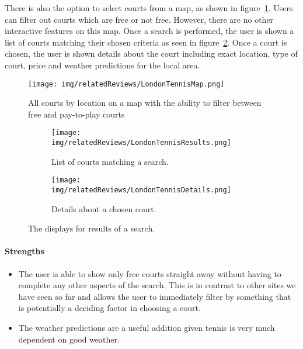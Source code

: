 There is also the option to select courts from a map, as shown in
figure~\ref{fig:LondonTennisMap}. Users can filter out courts which are free or
not free. However, there are no other interactive features on this map. Once a
search is performed, the user is shown a list of courts matching their chosen
criteria as seen in figure~\ref{fig:LondonTennisResults}. Once a court is
chosen, the user is shown details about the court including exact location,
type of court, price and weather predictions for the local area.
\begin{figure}
	\begin{center}
		\texttt{[image: img/relatedReviews/LondonTennisMap.png]}
	\end{center}
	\caption{All courts by location on a map with the ability to filter between
	free and pay-to-play courts}\label{fig:LondonTennisMap}
\end{figure}

\begin{figure}[htb]
	\centering
	\begin{subfigure}[b]{0.7\textwidth}
		\texttt{[image: img/relatedReviews/LondonTennisResults.png]}
		\caption{List of courts matching a search.
		}\label{fig:LondonTennisResults}
	\end{subfigure}
	\begin{subfigure}[b]{0.7\textwidth}
		\texttt{[image: img/relatedReviews/LondonTennisDetails.png]}
		\caption{Details about a chosen court. }\label{fig:LondonTennisDetails}
	\end{subfigure}
	\caption{The displays for results of a search.
	}\label{fig:LondonTennisResultsMain}
\end{figure}

\paragraph{Strengths}
\begin{itemize}
	\item The user is able to show only free courts straight away without
		having to complete any other aspects of the search. This is in contrast
		to other sites we have seen so far and allows the user to immediately
		filter by something that is potentially a deciding factor in choosing a
		court.
	\item The weather predictions are a useful addition given tennis is very
		much dependent on good weather.
\end{itemize}

